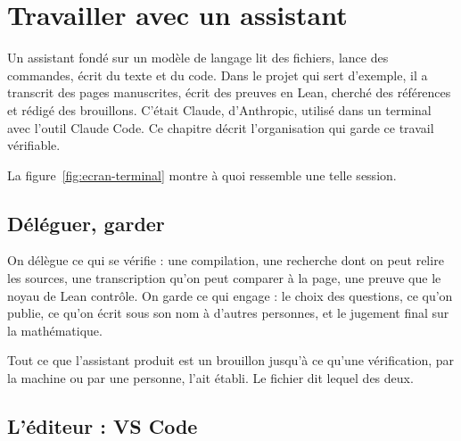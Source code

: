 \chapter{Travailler avec un assistant}

Un assistant fondé sur un modèle de langage lit des fichiers, lance des commandes, écrit du
texte et du code. Dans le projet qui sert d'exemple, il a transcrit des pages manuscrites,
écrit des preuves en Lean, cherché des références et rédigé des brouillons. C'était
Claude, d'Anthropic, utilisé dans un terminal avec l'outil Claude Code. Ce chapitre décrit
l'organisation qui garde ce travail vérifiable.

La figure~\ref{fig:ecran-terminal} montre à quoi ressemble une telle session.



\section{Déléguer, garder}

On délègue ce qui se vérifie : une compilation, une recherche dont on peut relire les
sources, une transcription qu'on peut comparer à la page, une preuve que le noyau de Lean
contrôle. On garde ce qui engage : le choix des questions, ce qu'on publie, ce qu'on écrit
sous son nom à d'autres personnes, et le jugement final sur la mathématique.

\begin{regle}
Tout ce que l'assistant produit est un brouillon jusqu'à ce qu'une vérification, par la
machine ou par une personne, l'ait établi. Le fichier dit lequel des deux.
\end{regle}

\section{L'éditeur : VS Code}

